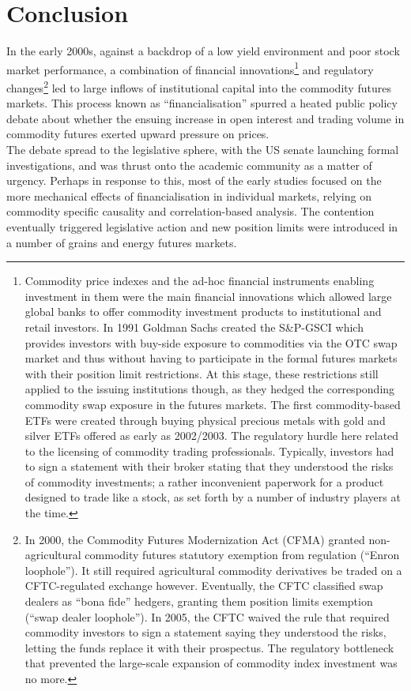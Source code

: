 \documentclass[
  authoryear,
  preprint,
  3p]{elsarticle}
\begin{document}
\newpage

\section{Conclusion}\label{conclusion}

In the early 2000s, against a backdrop of a low yield environment and
poor stock market performance, a combination of financial
innovations\footnote{Commodity price indexes and the ad-hoc financial
  instruments enabling investment in them were the main financial
  innovations which allowed large global banks to offer commodity
  investment products to institutional and retail investors. In 1991
  Goldman Sachs created the S\&P-GSCI which provides investors with
  buy-side exposure to commodities via the OTC swap market and thus
  without having to participate in the formal futures markets with their
  position limit restrictions. At this stage, these restrictions still
  applied to the issuing institutions though, as they hedged the
  corresponding commodity swap exposure in the futures markets. The
  first commodity-based ETFs were created through buying physical
  precious metals with gold and silver ETFs offered as early as
  2002/2003. The regulatory hurdle here related to the licensing of
  commodity trading professionals. Typically, investors had to sign a
  statement with their broker stating that they understood the risks of
  commodity investments; a rather inconvenient paperwork for a product
  designed to trade like a stock, as set forth by a number of industry
  players at the time.} and regulatory changes\footnote{In 2000, the
  Commodity Futures Modernization Act (CFMA) granted non-agricultural
  commodity futures statutory exemption from regulation (``Enron
  loophole''). It still required agricultural commodity derivatives be
  traded on a CFTC-regulated exchange however. Eventually, the CFTC
  classified swap dealers as ``bona fide'' hedgers, granting them
  position limits exemption (``swap dealer loophole''). In 2005, the
  CFTC waived the rule that required commodity investors to sign a
  statement saying they understood the risks, letting the funds replace
  it with their prospectus. The regulatory bottleneck that prevented the
  large-scale expansion of commodity index investment was no more.} led
to large inflows of institutional capital into the commodity futures
markets. This process known as ``financialisation'' spurred a heated
public policy debate about whether the ensuing increase in open interest
and trading volume in commodity futures exerted upward pressure on
prices.\\
The debate spread to the legislative sphere, with the US senate
launching formal investigations, and was thrust onto the academic
community as a matter of urgency. Perhaps in response to this, most of
the early studies focused on the more mechanical effects of
financialisation in individual markets, relying on commodity specific
causality and correlation-based analysis. The contention eventually
triggered legislative action and new position limits were introduced in
a number of grains and energy futures markets.
\end{document}

